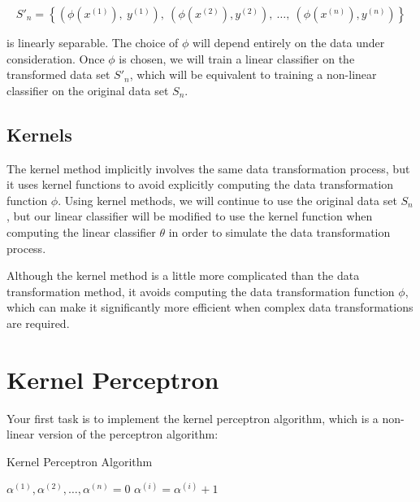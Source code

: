 \documentclass{article}
\begin{document}
$$S'_n = \left\{\left(\phi(x^{(1)}),\ y^{(1)}\right),\ \left(\phi(x^{(2)}), y^{(2)}\right),\ \dots,\ \left(\phi(x^{(n)}), y^{(n)}\right)\right\}$$

\noindent
is linearly separable. The choice of $\phi$ will depend entirely on the data under consideration. Once $\phi$ is chosen, we will train a linear classifier on the transformed data set $S'_n$, which will be equivalent to training a non-linear classifier on the original data set $S_n$.

\subsection{Kernels}

The kernel method implicitly involves the same data transformation process, but it uses kernel functions to avoid explicitly computing the data transformation function $\phi$. Using kernel methods, we will continue to use the original data set $S_n$, but our linear classifier will be modified to use the kernel function when computing the linear classifier $\theta$ in order to simulate the data transformation process.

Although the kernel method is a little more complicated than the data transformation method, it avoids computing the data transformation function $\phi$, which can make it significantly more efficient when complex data transformations are required.

\section{Kernel Perceptron}

Your first task is to implement the kernel perceptron algorithm, which is a non-linear version of the perceptron algorithm:

\begin{algorithm}[H]
    \caption{Kernel Perceptron Algorithm}
    \label{perceptron}
    
    \begin{algorithmic}[1]
        \State $\alpha^{(1)}, \alpha^{(2)}, \dots, \alpha^{(n)} = 0$
                    \State $\alpha^{(i)} = \alpha^{(i)} + 1$
                \EndIf
            \EndFor
        \EndFor
        \EndProcedure
    \end{algorithmic}
\end{algorithm}
\end{document}
